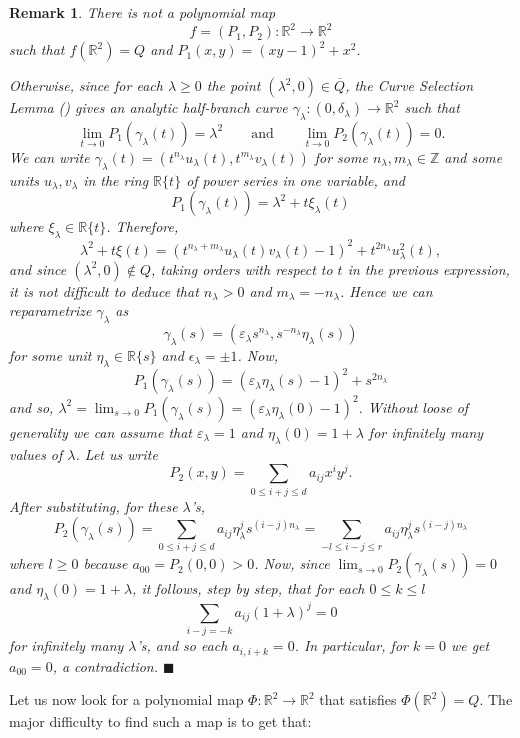 \documentclass[11pt,draft]{article}
\newtheorem{sremark}[thm]{Remark}
\newcommand{\fin}{\hspace*{\fill}$\blacksquare$\\[6pt]}
\newcommand{\Z}{{\mathbb Z}} \newcommand{\R}{{\mathbb R}}
\newcommand{\ol}{\overline}
\begin{document}
\begin{sremark}\em
There is not a polynomial map
$$f=(P_1,P_2):\R^2\rightarrow\R^2$$
such that $f(\R^2)=Q$ and $P_1(x,y)=(xy-1)^2+x^2$.

Otherwise, since for each $\lambda\geq 0$ the point $(\lambda^2,0)\in\ol{Q}$, the Curve 
Selection Lemma (\cite[VIII.2.6]{abr}) gives an analytic half-branch curve
$\gamma_\lambda:(0,\delta_\lambda)\rightarrow \R^2$ such that
$$
\lim_{t\rightarrow 0} P_1(\gamma_{\lambda}(t))=\lambda^2 \qquad \text{and} \qquad 
\lim_{t\rightarrow 0} P_2(\gamma_{\lambda}(t))=0.
$$
We can write $\gamma_{\lambda}(t)=(t^{n_{\lambda}}u_{\lambda}(t),t^{m_{\lambda}}
v_{\lambda}(t))$ for some $n_{\lambda},m_{\lambda}\in\Z$ and some units
$u_{\lambda},v_{\lambda}$ in the ring $\R\{t\}$ of power series in one variable,
and 
$$
P_1(\gamma_{\lambda}(t))=\lambda^2+t\xi_{\lambda}(t)
$$
where $\xi_{\lambda}\in\R\{t\}$. Therefore,
$$
\lambda^2+t\xi(t)=(t^{n_{\lambda}+m_{\lambda}}u_{\lambda}(t)v_{\lambda}(t)-1)^2+t^{2n_{\lambda}}u_{\lambda}^2(t),
$$
and since $(\lambda^2,0)\not\in Q$, taking orders with respect to $t$ in the previous 
expression, it is not difficult to deduce that $n_{\lambda}>0$ and
$m_{\lambda}=-n_{\lambda}$. Hence we can reparametrize $\gamma_{\lambda}$ as 
$$
\gamma_{\lambda}(s)=(\varepsilon_{\lambda}s^{n_{\lambda}},s^{-n_{\lambda}}\eta_{\lambda}(s))
$$
for some unit $\eta_{\lambda}\in\R\{s\}$ and $\epsilon_{\lambda}=\pm 1$. Now,
$$P_1(\gamma_{\lambda}(s))=(\varepsilon_{\lambda}\eta_{\lambda}(s)-1)^2+s^{2n_\lambda} $$
and so, 
$\lambda^2=\lim_{s\rightarrow 0}
P_1(\gamma_{\lambda}(s))=(\varepsilon_{\lambda}\eta_{\lambda}(0)-1)^2$. Without loose of
generality we can assume that $\varepsilon_{\lambda}=1$ and
$\eta_{\lambda}(0)=1+\lambda$ for infinitely many values of
$\lambda$. Let us write
$$
P_2(x,y)=\sum_{0\leq i+j\leq d} a_{ij}x^iy^j.
$$
After substituting, for these $\lambda$'s,
$$
P_2(\gamma_{\lambda}(s))=\sum_{0\leq i+j\leq d}
a_{ij}\eta_{\lambda}^js^{(i-j)n_{\lambda}}=\sum_{-l\leq i-j\leq r}
a_{ij}\eta_{\lambda}^js^{(i-j)n_{\lambda}}
$$
where $l\geq 0$ because $a_{00}=P_2(0,0)>0$. Now, since $\lim_{s\rightarrow
0}P_2(\gamma_{\lambda}(s))=0$ and $\eta_{\lambda}(0)=1+\lambda$, it follows, step by step,
that for each $0\leq k\leq l$
$$
\sum_{i-j=-k}a_{ij}(1+\lambda)^j=0
$$
for infinitely many $\lambda$'s, and so each $a_{i,i+k}=0$. In particular, for $k=0$ we get 
$a_{00}=0$, a contradiction.
\fin
\em
\end{sremark} 

Let us now look for a polynomial map $\Phi:\R^2\rightarrow\R^2$ that satisfies
$\Phi(\R^2)=Q$. The major difficulty to find such a map is to get that: 
\end{document}
